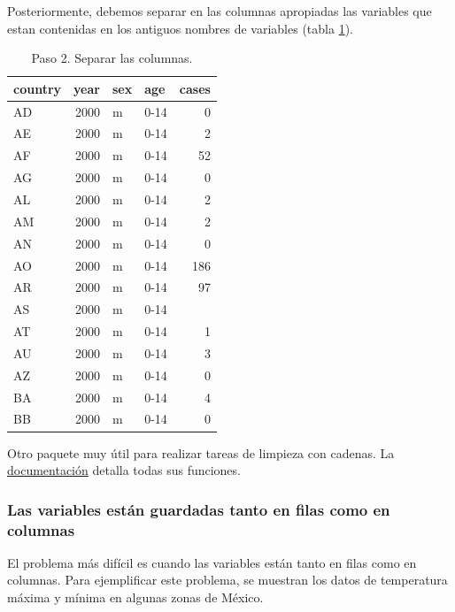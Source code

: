 \documentclass[]{article}
\begin{document}
Posteriormente, debemos separar en las columnas apropiadas las variables
que estan contenidas en los antiguos nombres de variables (tabla
\ref{tab:tbseparar}).

\begin{table}[ht]
\centering
\begin{tabular}{lrllr}
  \hline
country & year & sex & age & cases \\ 
  \hline
AD & 2000 & m & 0-14 &   0 \\ 
  AE & 2000 & m & 0-14 &   2 \\ 
  AF & 2000 & m & 0-14 &  52 \\ 
  AG & 2000 & m & 0-14 &   0 \\ 
  AL & 2000 & m & 0-14 &   2 \\ 
  AM & 2000 & m & 0-14 &   2 \\ 
  AN & 2000 & m & 0-14 &   0 \\ 
  AO & 2000 & m & 0-14 & 186 \\ 
  AR & 2000 & m & 0-14 &  97 \\ 
  AS & 2000 & m & 0-14 &  \\ 
  AT & 2000 & m & 0-14 &   1 \\ 
  AU & 2000 & m & 0-14 &   3 \\ 
  AZ & 2000 & m & 0-14 &   0 \\ 
  BA & 2000 & m & 0-14 &   4 \\ 
  BB & 2000 & m & 0-14 &   0 \\ 
   \hline
\end{tabular}
\caption{Paso 2. Separar las columnas.} 
\label{tab:tbseparar}
\end{table}

\begin{nota}[stringr]
Otro paquete muy útil para realizar tareas de limpieza con cadenas. 
La \href{https://cran.r-project.org/web/packages/stringr/stringr.pdf}{documentación}
detalla todas sus funciones.
\end{nota}

\subsubsection{Las variables están guardadas tanto en filas como en
columnas}\label{las-variables-estan-guardadas-tanto-en-filas-como-en-columnas}

El problema más difícil es cuando las variables están tanto en filas
como en columnas. Para ejemplificar este problema, se muestran los datos
de temperatura máxima y mínima en algunas zonas de México.
\end{document}
